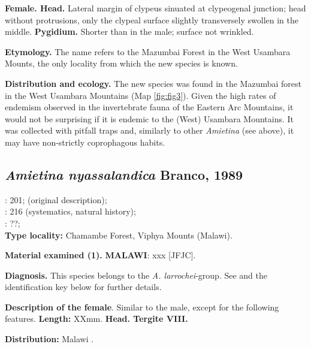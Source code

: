 \documentclass[fleqn,10pt,lineno]{wlpeerj}
\begin{document}
\textbf{Female. Head.} Lateral margin of clypeus sinuated at clypeogenal junction; head without protrusions, only the clypeal surface slightly transversely swollen in the middle. \textbf{Pygidium.} Shorter than in the male; surface not wrinkled.

\textbf{Etymology.} The name refers to the Mazumbai Forest in the West Usambara Mounts, the only locality from which the new species is known.

\textbf{Distribution and ecology.} The new species was found in the Mazumbai forest in the West Usambara Mountains (Map \ref{fig:fig3}). Given the high rates of endemism observed in the invertebrate fauna of the Eastern Arc Mountains, it would not be surprising if it is endemic to the (West) Usambara Mountains. It was collected with pitfall traps and, similarly to other \textit{Amietina} (see above), it may have non-strictly coprophagous habits.


\subsection*{\textbf{\textit{Amietina nyassalandica} Branco, 1989}\\}

\cite{branco1988deux}: 201; (original description);\\
\cite{davis2008african}: 216 (systematics, natural history);\\
\cite{josso2008unidentis}: ??;\\

\tab\textbf{Type locality:} Chamambe Forest, Viphya Mounts (Malawi).

\textbf{Material examined (1\female).} \textbf{MALAWI}: xxx [JFJC].

\textbf{Diagnosis.} This species belongs to the \textit{A. larrochei}-group. See \citep{branco1988deux} and the identification key below for further details.

\textbf{Description of the female}. Similar to the male, except for the following features. \textbf{Length:} XXmm. \textbf{Head. Tergite VIII. }

\textbf{Distribution:} Malawi \citep{branco1988deux}.
\end{document}
